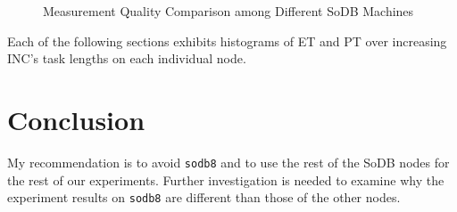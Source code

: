 \documentclass[10pt]{article}
\begin{document}
\begin{figure}[t]
{        \label{fig:pt_std}
    }
    \caption{Measurement Quality Comparison among Different SoDB Machines}
    \label{fig:machine_comp}
\end{figure}

\newpage

Each of the following sections exhibits histograms of ET and PT 
over increasing INC's task lengths on each individual node. 






\newpage

\section{Conclusion}
My recommendation is to avoid {\tt sodb8} and to use the rest of 
the SoDB nodes for the rest of our experiments. Further investigation is 
needed to examine why the experiment results on {\tt sodb8} are different 
than those of the other nodes. 
\end{document}
